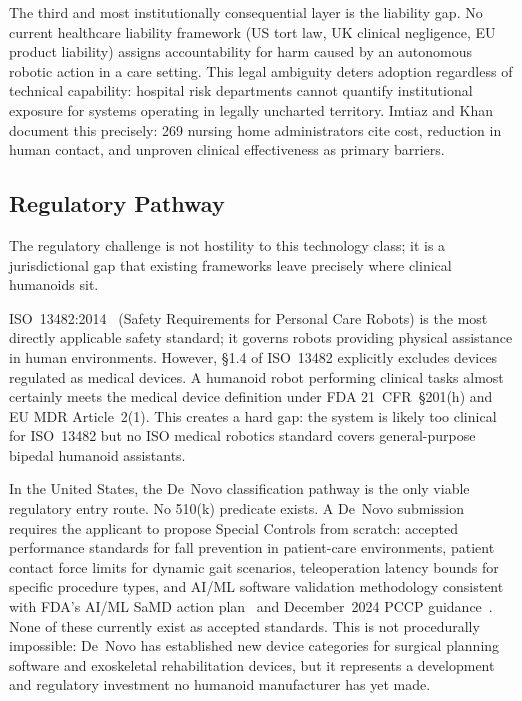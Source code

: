 \documentclass[acmjour]{acmart}
\begin{document}
The third and most institutionally consequential layer is the liability gap. No
current healthcare liability framework (US tort law, UK clinical negligence, EU
product liability) assigns accountability for harm caused by an autonomous
robotic action in a care setting. This legal ambiguity deters adoption regardless
of technical capability: hospital risk departments cannot quantify institutional
exposure for systems operating in legally uncharted territory. Imtiaz and
Khan~\cite{imtiaz2024perceptions} document this precisely: 269 nursing home
administrators cite cost, reduction in human contact, and unproven clinical
effectiveness as primary barriers.

\subsection{Regulatory Pathway}
\label{sec:regulatory}

The regulatory challenge is not hostility to this technology class; it is a
jurisdictional gap that existing frameworks leave precisely where clinical
humanoids sit.

ISO~13482:2014~\cite{iso13482} (Safety Requirements for Personal Care Robots) is
the most directly applicable safety standard; it governs robots providing
physical assistance in human environments. However, \S{}1.4 of ISO~13482
explicitly excludes devices regulated as medical devices. A humanoid robot performing
clinical tasks almost certainly meets the medical device definition under FDA
21~CFR~\S{}201(h) and EU MDR Article~2(1). This creates a hard gap: the system
is likely too clinical for ISO~13482 but no ISO medical robotics standard covers
general-purpose bipedal humanoid assistants.

In the United States, the De~Novo classification pathway is the only viable
regulatory entry route. No 510(k) predicate exists. A De~Novo submission requires
the applicant to propose Special Controls from scratch: accepted performance
standards for fall prevention in patient-care environments, patient contact force
limits for dynamic gait scenarios, teleoperation latency bounds for specific
procedure types, and AI/ML software validation methodology consistent with FDA's
AI/ML SaMD action plan~\cite{fda2021aiml} and December~2024 PCCP
guidance~\cite{fda2024pccp}. None of these currently exist as accepted standards. This is not procedurally
impossible: De~Novo has established new device categories for surgical planning
software and exoskeletal rehabilitation devices, but it represents a development
and regulatory investment no humanoid manufacturer has yet made.
\end{document}
